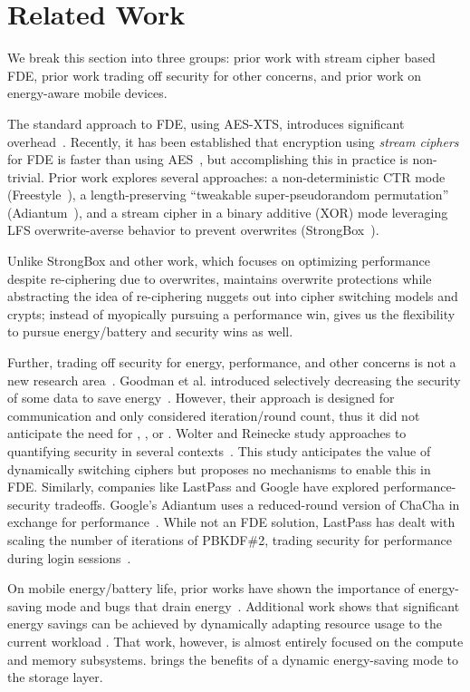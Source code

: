 \section{Related Work}\label{sec:related}

We break this section into three groups: prior work with stream cipher based
FDE, prior work trading off security for other concerns, and prior work on
energy-aware mobile devices.

 The standard approach to FDE, using AES-XTS,
introduces significant overhead~\cite{AESItself}. Recently, it has been
established that encryption using {\em stream ciphers} for FDE is faster than
using AES~\cite{StrongBox}, but accomplishing this in practice is non-trivial.
Prior work explores several approaches: a non-deterministic CTR mode
(Freestyle~\cite{Freestyle}), a length-preserving ``tweakable super-pseudorandom
permutation'' (Adiantum~\cite{Adiantum}), and a stream cipher in a binary
additive (XOR) mode leveraging LFS overwrite-averse behavior to prevent
overwrites (StrongBox~\cite{StrongBox}).

Unlike StrongBox and other work, which focuses on optimizing performance despite
re-ciphering due to overwrites, \sys maintains overwrite protections while
abstracting the idea of re-ciphering nuggets out into cipher switching models
and crypts; instead of myopically pursuing a performance win, \sys gives us the
flexibility to pursue energy/battery and security wins as well.

 Further, trading off security for
energy, performance, and other concerns is not a new research
area~\cite{ScalableSecurity, WolterReinecke, ZengChow1, HaleemEtAl,
LiOmiecinski, Merkel4, Merkle3}. Goodman et al. introduced selectively
decreasing the security of some data to save energy~\cite{ScalableSecurity}.
However, their approach is designed for communication and only considered
iteration/round count, thus it did not anticipate the need for \sysA, \sysB, or
\sysC. Wolter and Reinecke study approaches to quantifying security in several
contexts~\cite{WolterReinecke}. This study anticipates the value of dynamically
switching ciphers but proposes no mechanisms to enable this in FDE. Similarly,
companies like LastPass and Google have explored performance-security tradeoffs.
Google's Adiantum uses a reduced-round version of ChaCha in exchange for
performance~\cite{Adiantum}. While not an FDE solution, LastPass has dealt with
scaling the number of iterations of PBKDF\#2, trading security for performance
during login sessions~\cite{LastPass}.

 On mobile energy/battery life,
prior works have shown the importance of energy-saving mode and bugs
that drain energy~\cite{energy-doctor, power-aware}. Additional work
shows that significant energy savings can be achieved by dynamically
adapting resource usage to the current workload
\cite{Mishra18,Flinn99,Hoffmann15,LeSueur11}. That work, however, is
almost entirely focused on the compute and memory subsystems.  \sys
brings the benefits of a dynamic energy-saving mode to the storage
layer.
